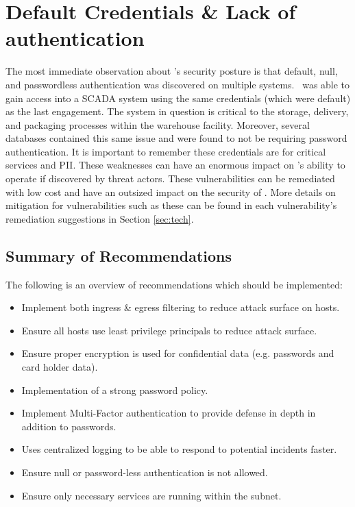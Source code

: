 \section*{Default Credentials \& Lack of authentication}
The most immediate observation about \cptc's security posture is that default, null, and passwordless authentication was discovered on multiple systems. \teamname\ was able to gain access into a SCADA system using the same credentials (which were default) as the last engagement.  The system in question is critical to the storage, delivery, and packaging processes within the warehouse facility. Moreover, several databases contained this same issue and were found to not be requiring password authentication. It is important to remember these credentials are for critical services and PII. These weaknesses can have an enormous impact on \cptc's ability to operate if discovered by threat actors. These vulnerabilities can be remediated with low cost and have an outsized impact on the security of \cptc. More details on mitigation for vulnerabilities such as these can be found in each vulnerability's remediation suggestions in Section \ref{sec:tech}. 


    

\subsection{Summary of Recommendations}

The following is an overview of recommendations which should be implemented:

\begin{itemize}
    \item Implement both ingress \& egress filtering to reduce attack surface on hosts.
    \item Ensure all hosts use least privilege principals to reduce attack surface.
    \item Ensure proper encryption is used for confidential data (e.g. passwords and card holder data).
    \item Implementation of a strong password policy.
    \item Implement Multi-Factor authentication to provide defense in depth in addition to passwords.
    \item Uses centralized logging to be able to respond to potential incidents faster.
    \item Ensure null or password-less authentication is not allowed.
    \item Ensure only necessary services are running within the subnet.
\end{itemize}

